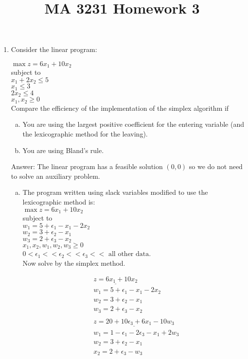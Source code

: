 \documentclass{article}
\title{MA 3231 Homework 3}
\date{}
\author{}
\begin{document}
\maketitle

\begin{enumerate}

\item

Consider the linear program:

$\max z = 6x_1 + 10x_2$\\
subject to \\
$x_1 + 2x_2 \leq 5$\\
$x_1 \leq 3$ \\
$2x_2 \leq 4$ \\
$x_1, x_2 \geq 0$\\

Compare the efficiency of the implementation of the simplex algorithm if 

\begin{enumerate}[a)]
\item You are using the largest positive coefficient for the entering variable (and the lexicographic method for the leaving).

\item You are using Bland's rule. 
\end{enumerate}

Answer: The linear program has a feasible solution $(0,0)$ so we do not need to solve an auxiliary problem.

\begin{enumerate}[a)]


\item The program written using slack variables modified to use the lexicographic method is: \\

$\max z = 6x_1 + 10x_2$\\
subject to \\
$w_1 = 5 + \epsilon_1 - x_1 - 2x_2$\\
$w_2 = 3 + \epsilon_2 - x_1$ \\
$w_3 = 2 + \epsilon_3 - x_2$ \\
$x_1, x_2, w_1, w_2, w_3 \geq 0$\\
$0<\epsilon_1 << \epsilon_2 << \epsilon_3 << \text{ all other data}$. \\

Now solve by the simplex method.

\begin{align*}
&\underline{z = 6x_1 + 10x_2} \\
&w_1 = 5 + \epsilon_1 - x_1 - 2x_2 \\
&w_2 = 3 + \epsilon_2 - x_1\\
& w_3 = 2 + \epsilon_3 - x_2 \\
&\\
&\underline{z = 20 + 10\epsilon_3 + 6x_1 - 10w_3} \\
&w_1 = 1 - \epsilon_1 - 2 \epsilon_3  - x_1 + 2w_3 \\
&w_2 = 3 + \epsilon_2 - x_1\\
& x_2 = 2 + \epsilon_3 - w_3 \\
\end{align*}


\end{enumerate}
\end{enumerate}
\end{document}
